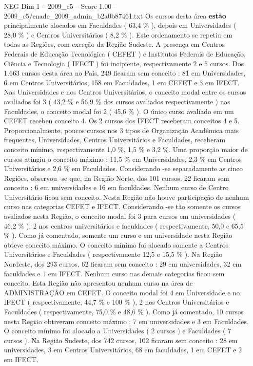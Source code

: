 \begin{textsample}{NEG Dim 1 – 2009\_c5 – Score 1.00 – 2009\_c5/enade\_2009\_admin\_b2a0b87461.txt}
Os cursos desta área \textbf{estão} principalmente alocados em Faculdades ( 63,4 \% ), depois em Universidades ( 28,0 \% ) e Centros Universitários ( 8,2 \% ).
Este ordenamento se repetiu em todas as Regiões, com exceção da Região Sudeste.
A presença em Centros Federais de Educação Tecnológica ( CEFET ) e Institutos Federais de Educação, Ciência e Tecnologia ( IFECT ) foi incipiente, respectivamente 2 e 5 cursos.
Dos 1.663 cursos desta área no País, 249 ficaram sem conceito : 81 em Universidades, 6 em Centros Universitários, 158 em Faculdades, 1 em CEFET e 3 em IFECT.
Nas Universidades e nos Centros Universitários, o conceito modal entre os cursos avaliados foi 3 ( 43,2 \% e 56,9 \% dos cursos avaliados respectivamente ) nas Faculdades, o conceito modal foi 2 ( 45,6 \% ).
O único curso avaliado em um CEFET recebeu conceito 4.
Os 2 cursos dos IFECT receberam conceitos 4 e 5.
Proporcionalmente, poucos cursos nos 3 tipos de Organização Acadêmica mais frequentes, Universidades, Centros Universitários e Faculdades, receberam conceito mínimo, respectivamente 1,0 \%, 1,5 \% e 3,2 \%.
Uma proporção maior de cursos atingiu o conceito máximo : 11,5 \% em Universidades, 2,3 \% em Centros Universitários e 2,6 \% em Faculdades.
Considerando -se separadamente as cinco Regiões, observou -se que, na Região Norte, dos 101 cursos, 22 ficaram sem conceito : 6 em universidades e 16 em faculdades.
Nenhum curso de Centro Universitário ficou sem conceito.
Nesta Região não houve participação de nenhum curso nas categorias CEFET e IFECT.
Considerando -se tão somente os cursos avaliados nesta Região, o conceito modal foi 3 para cursos em universidades ( 46,2 \% ), 2 nos centros universitários e faculdades ( respectivamente, 50,0 e 65,5 \% ).
Como já comentado, somente um curso e em universidade nesta Região obteve conceito máximo.
O conceito mínimo foi alocado somente a Centros Universitários e Faculdades ( respectivamente 12,5 e 15,5 \% ).
Na Região Nordeste, dos 293 cursos, 62 ficaram sem conceito : 29 em universidades, 32 em faculdades e 1 em IFECT.
Nenhum curso nas demais categorias ficou sem conceito.
Esta Região não apresentou nenhum curso na área de ADMINISTRAÇÃO em CEFET.
O conceito modal foi 4 em Universidade e no IFECT ( respectivamente, 44,7 \% e 100 \% ), 2 nos Centros Universitários e Faculdades ( respectivamente, 75,0 \% e 48,6 \% ).
Como já comentado, 10 cursos nesta Região obtiveram conceito máximo : 7 em universidades e 3 em Faculdades.
O conceito mínimo foi alocado a Universidades ( 2 cursos ) e Faculdades ( 7 cursos ).
Na Região Sudeste, dos 742 cursos, 102 ficaram sem conceito : 28 em universidades, 3 em Centros Universitários, 68 em faculdades, 1 em CEFET e 2 em IFECT.

\end{textsample}
